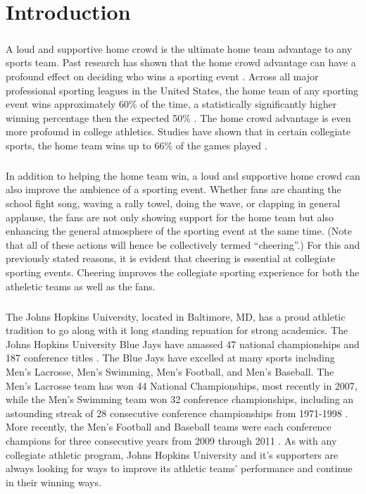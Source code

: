 \documentclass[oneside,12pt]{report}
\def\prefacesection#1{
\chapter*{#1}
\addcontentsline{toc}{chapter}{#1}
}
\begin{document}
\listoffigures



\renewcommand{\thefootnote}{\arabic{footnote}}
\setcounter{footnote}{0}

\prefacesection{Introduction}
\paragraph{}
A loud and supportive home crowd is the ultimate home team advantage to any sports team. Past research has shown that the home crowd advantage can have a profound effect on deciding who wins a sporting event \cite{Jamieson_2010}. Across all major professional sporting leagues in the United States, the home team of any sporting event wins approximately 60\% of the time, a statistically significantly higher winning percentage then the expected 50\% \cite{Jamieson_2010}. The home crowd advantage is even more profound in college athletics. Studies have shown that in certain collegiate sports, the home team wins up to 66\% of the games played \cite{Snyder_1985}.

\paragraph{}
In addition to helping the home team win, a loud and supportive home crowd can also improve the ambience of a sporting event. Whether fans are chanting the school fight song, waving a rally towel, doing the wave, or clapping in general applause, the fans are not only showing support for the home team but also enhancing the general atmosphere of the sporting event at the same time. (Note that all of these actions will hence be collectively termed ``cheering''.) For this and previously stated reasons, it is evident that cheering is essential at collegiate sporting events. Cheering improves the collegiate sporting experience for both the atheletic teams as well as the fans. 

\paragraph{}
The Johns Hopkins University, located in Baltimore, MD, has a proud athletic tradition to go along with it long standing repuation for strong academics. The Johns Hopkins University Blue Jays have amassed 47 national championships and 187 conference titles \cite{hopathletic}. The Blue Jays have excelled at many sports including Men's Lacrosse, Men's Swimming, Men's Football, and Men's Baseball. The Men's Lacrosse team has won 44 National Championships, most recently in 2007, while the Men's Swimming team won 32 conference championships, including an astounding streak of 28 consecutive conference championships from 1971-1998 \cite{hopathletic}. More recently, the Men's Football and Baseball teams were each conference champions for three consecutive years from 2009 through 2011 \cite{hopathletic}. As with any collegiate athletic program, Johns Hopkins University and it's supporters are always looking for ways to improve its athletic teams' performance and continue in their winning ways.
\end{document}
